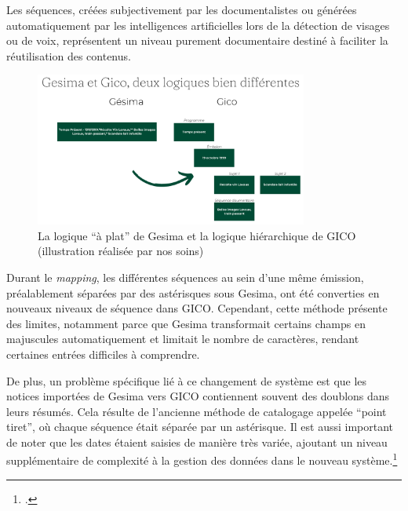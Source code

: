 	Les séquences, créées subjectivement par les documentalistes ou générées automatiquement par les intelligences artificielles lors de la détection de visages ou de voix, représentent un niveau purement documentaire destiné à faciliter la réutilisation des contenus.
	
	\begin{figure}[h!]
		\centering
		\includegraphics[width=0.8\textwidth]{images/gesimavsgico.png}
		\caption{La logique \enquote{à plat} de Gesima et la logique hiérarchique de GICO (illustration réalisée par nos soins)}
		\label{fig:image1}
	\end{figure}
	
	
	Durant le \emph{mapping}, les différentes séquences au sein d'une même émission, préalablement séparées par des astérisques sous Gesima, ont été converties en nouveaux niveaux de séquence dans GICO. Cependant, cette méthode présente des limites, notamment parce que Gesima transformait certains champs en majuscules automatiquement et limitait le nombre de caractères, rendant certaines entrées difficiles à comprendre.
	
	De plus, un problème spécifique lié à ce changement de système est que les notices importées de Gesima vers GICO contiennent souvent des doublons dans leurs résumés. Cela résulte de l'ancienne méthode de catalogage appelée \enquote{point tiret}, où chaque séquence était séparée par un astérisque. Il est aussi important de noter que les dates étaient saisies de manière très variée, ajoutant un niveau supplémentaire de complexité à la gestion des données dans le nouveau système.\footcite{sonderegger2024}



